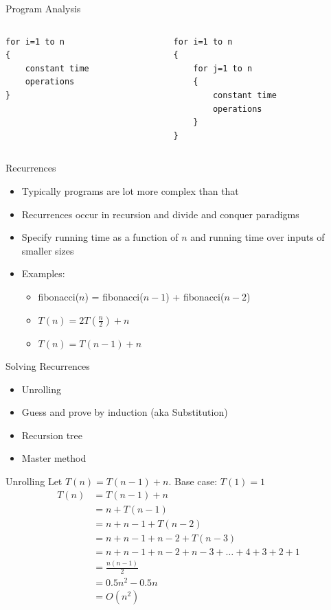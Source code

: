 \documentclass{beamer}
\begin{document}
\begin{frame}[fragile]{Program Analysis}
  \begin{columns}
    \begin{column}{0.5\textwidth}
\begin{verbatim}
for i=1 to n
{
    constant time
    operations
}
\end{verbatim}
    \end{column}
    \begin{column}{0.5\textwidth}
\begin{verbatim}
for i=1 to n
{
    for j=1 to n
    {
        constant time 
        operations 
    }
}
\end{verbatim}
    \end{column}
  \end{columns}
\end{frame}

\begin{frame}{Recurrences}
\begin{itemize}
\item Typically programs are lot more complex than that
\item Recurrences occur in recursion and divide and conquer paradigms
\item Specify running time as a function of $n$ and running time over inputs of smaller sizes
\item Examples:
\begin{itemize}
    \item fibonacci($n$) = fibonacci($n-1$) + fibonacci($n-2$)
    \item $T(n) = 2T(\frac{n}{2}) + n$
    \item $T(n) = T(n-1) + n$
\end{itemize}
\end{itemize}
\end{frame}


\begin{frame}{Solving Recurrences}
\begin{itemize}
\item Unrolling
\item Guess and prove by induction (aka Substitution)
\item Recursion tree
\item Master method
\end{itemize}
\end{frame}


\begin{frame}{Unrolling}
Let $T(n) = T(n-1) + n$. Base case: $T(1)=1$
\begin{align*}
T(n)    &= T(n-1) + n \\
        &= n + T(n-1) \\
        &= n + n-1 + T(n-2) \\
        &= n + n-1 + n-2 + T(n-3) \\
        &= n + n-1 + n-2 + n-3 + \ldots + 4 + 3 + 2 + 1 \\
        &= \frac{n(n-1)}{2} \\
        &= 0.5n^2 - 0.5n \\
        &= O(n^2)
\end{align*}
\end{frame}
\end{document}
